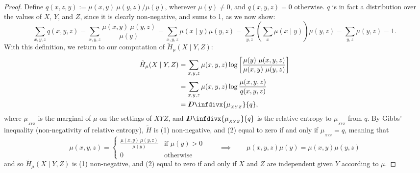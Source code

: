 \documentclass{article}
\theoremstyle{plain}
\theoremstyle{definition}
\theoremstyle{remark}
\newcommand{\thickD}{I\mkern-8muD}
\newcommand{\kldiv}{\thickD\infdivx}
\numberwithin{equation}{section}
\begin{document}
{\begin{proof}
Define $q(x,z,y) := {\mu(x,y)\ \mu(y,z) }/{\mu(y)}$, wherever
			$\mu(y)\neq 0$, and $q(x,y,z) = 0$ otherwise. $q$ is in fact
	a distribution over the values of $X$, $Y$, and $Z$, since it  
is clearly non-negative, and sums to 1, as we now show:
\[
\sum_{x,y,z} q(x,y, z) = \sum_{x,y,z} \frac{\mu(x,y)\ \mu(y,z)}{\mu(y)}
= \sum_{x,y,z} \mu(x \mid y) \mu(y,z)
= \sum_{y,z} \left(\sum_x \mu(x \mid y)\right) \mu(y,z)
= \sum_{y,z}  \mu(y,z)
		= 1.
\]	
With this definition, we return to our computation of $\tilde H_\mu(X \mid Y, Z)$:
\begin{align*}
	\tilde H_\mu(X \mid Y, Z) &= \sum_{x,y, z}  \mu(x,y ,z) \log \left[\frac{\mu(y)\ \mu(x,y,z)}{\mu(x,y)\ \mu(y,z)} \right]  \\ %
	&= \sum_{x,y, z}  \mu(x,y ,z) \log \frac{\mu(x,y,z)}{q(x,y,z)}  \\
					&= \kldiv{\mu_{_{XYZ}}}{q},
\end{align*}
where $\mu_{_{XYZ}}$ is the marginal of $\mu$ on the settings of $XYZ$, and $\kldiv{\mu_{_{XYZ}}}{q}$ is the relative entropy to $\mu_{_{XYZ}}$ from $q$. By Gibbs' inequality (non-negativity of relative entropy), $\tilde H$ is  (1) non-negative, and (2) equal to zero if and only if $\mu_{_{XYZ}} = q$, meaning that 
\[  \mu(x,y,z) =\begin{cases} \frac{\mu(x,y)\ \mu(y,z)}{\mu(y)} & \text{if }\mu(y) > 0\\ 0 & \text{otherwise} \end{cases} \qquad \implies \qquad \mu(x,y,z) \mu(y) = \mu(x,y) \mu(y, z) \] 
and so $\tilde H_\mu(X \mid Y, Z)$ is (1) non-negative, and
	(2) equal to zero if and only if $X$ and $Z$ are independent
			given $Y$ according to $\mu$. 
\end{proof}
}
\end{document}
